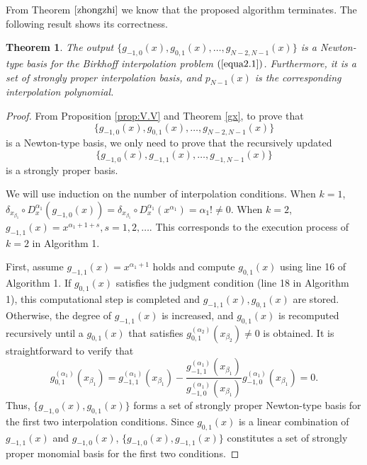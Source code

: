 \documentclass[preprint,12pt]{elsarticle}
\newtheorem{theorem}{Theorem}
\begin{document}
\newpage
From Theorem $\ref{zhongzhi}$ we know   that the proposed  algorithm terminates. The following result shows its correctness.
\begin{theorem}
 The output  $\{g_{-1,0}(x), g_{0,1}(x), \dots, g_{N-2,N-1}(x)\}$ is a Newton-type   basis for the Birkhoff interpolation problem $(\ref{equa2.1})$. Furthermore, it is  a set of strongly  proper interpolation basis, and $p_{N-1}(x)$ is the corresponding interpolation polynomial.
\end{theorem}
\begin{proof}
From Proposition \ref{prop:V.V} and Theorem \ref{gx}, to prove that
\begin{displaymath}
  \{g_{-1,0}(x), g_{0,1}(x), \dots, g_{N-2,N-1}(x)\}  
\end{displaymath}
is a Newton-type basis,
we only need to prove that the recursively updated
\begin{displaymath}
  \{g_{-1,0}(x), g_{-1,1}(x), \dots, g_{-1,N-1}(x)\}  
\end{displaymath}
 is a strongly proper basis.

We will use induction on the number of interpolation conditions.
When $k=1$, $ \delta_{x_{\beta_1}}\circ D_x^{\alpha_1}(g_{-1,0}(x))= \delta_{x_{\beta_1}}\circ D_x^{\alpha_1}(x^{\alpha_1})=\alpha_1!\neq 0.$
When $k=2$, $g_{-1,1}(x)=x^{\alpha_1+1+s}, s=1,2,\dots$. This corresponds to the execution process of $k=2$ in Algorithm 1. 

First, assume $g_{-1,1}(x)=x^{\alpha_1+1}$ holds and compute $g_{0,1}(x)$ using line 16 of Algorithm 1. If $g_{0,1}(x)$ satisfies the judgment condition (line 18 in Algorithm 1), this computational step is completed and
$g_{-1,1}(x),g_{0,1}(x)$ are stored. Otherwise, the degree of $g_{-1,1}(x)$ is increased, and 
$g_{0,1}(x)$ is recomputed recursively until a 
$g_{0,1}(x)$
 that satisfies 
$g_{0,1}^{(\alpha_2)}(x_{\beta_2})\neq 0$
 is obtained.
It is straightforward to verify that 
\begin{displaymath}
    g_{0,1}^{(\alpha_1)}(x_{\beta_1})=g_{-1,1}^{(\alpha_1)}(x_{\beta_1})-\frac{g_{-1,1}^{(\alpha_1)}(x_{\beta_1})}{g_{-1,0}^{(\alpha_1)}(x_{\beta_1})}g_{-1,0}^{(\alpha_1)}(x_{\beta_1})=0.
\end{displaymath} 
Thus, $\{g_{-1,0}(x),g_{0,1}(x)\}$ forms a set of strongly proper Newton-type basis for the first two interpolation conditions. Since $g_{0,1}(x)$ is a linear combination of $g_{-1,1}(x)$ and $g_{-1,0}(x)$, 
$\{g_{-1,0}(x),g_{-1,1}(x)\}$ constitutes a set of strongly proper monomial basis for the first two conditions.



\end{proof}
\end{document}
